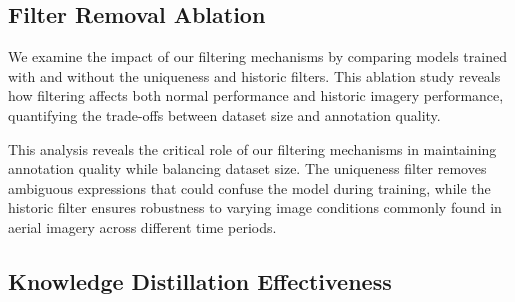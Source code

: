 \subsection{Filter Removal Ablation}
\label{subsec:filter_ablation}

We examine the impact of our filtering mechanisms by comparing models trained with and without the uniqueness and historic filters. This ablation study reveals how filtering affects both normal performance and historic imagery performance, quantifying the trade-offs between dataset size and annotation quality.

\begin{table*}[t]
\centering
\caption{Impact of Filter Removal on Model Performance}
\label{tab:filter_ablation}
\end{table*}

This analysis reveals the critical role of our filtering mechanisms in maintaining annotation quality while balancing dataset size. The uniqueness filter removes ambiguous expressions that could confuse the model during training, while the historic filter ensures robustness to varying image conditions commonly found in aerial imagery across different time periods.

\subsection{Knowledge Distillation Effectiveness}
\label{subsec:distillation_ablation}

